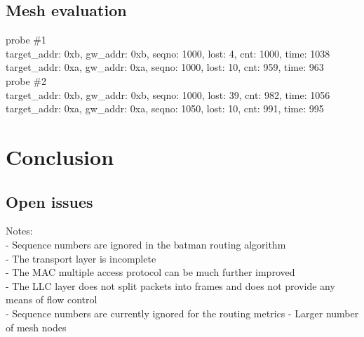\section{Mesh evaluation}%
probe \#1 \\
target\_addr: 0xb, gw\_addr: 0xb, seqno: 1000, lost: 4, cnt: 1000, time: 1038 \\
target\_addr: 0xa, gw\_addr: 0xa, seqno: 1000, lost: 10, cnt: 959, time: 963 \\

probe \#2 \\
target\_addr: 0xb, gw\_addr: 0xb, seqno: 1000, lost: 39, cnt: 982, time: 1056 \\
target\_addr: 0xa, gw\_addr: 0xa, seqno: 1050, lost: 10, cnt: 991, time: 995 \\

\chapter{Conclusion}%
\section{Open issues}%
Notes:\\
- Sequence numbers are ignored in the batman routing algorithm \\
- The transport layer is incomplete \\
- The MAC multiple access protocol can be much further improved\\
- The LLC layer does not split packets into frames and does not provide any means of flow control\\
- Sequence numbers are currently ignored for the routing metrics
- Larger number of mesh nodes
